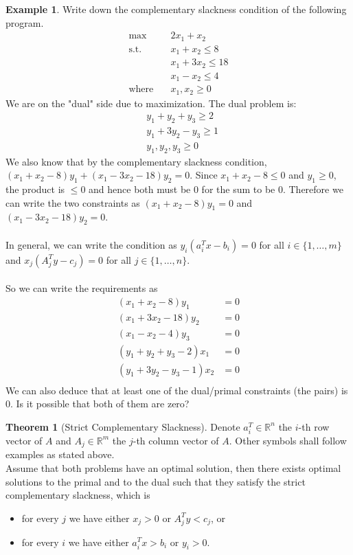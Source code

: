 \documentclass{article}
\theoremstyle{definition}
\newtheorem{theorem}{Theorem}[section]
\newtheorem{example}{Example}[section]
\begin{document}
	\begin{example}
		Write down the complementary slackness condition of the following program.
		\begin{align*}
			\text{max} \quad& 2x_1+x_2 \\
			\text{s.t.} \quad& x_1+x_2\leq8 \\
			& x_1+3x_2\leq 18 \\
			& x_1-x_2 \leq 4\\
			\text{where} \quad& x_1, x_2 \geq 0
		\end{align*}
		We are on the "dual" side due to maximization. The dual problem is:
		\begin{align*}
			& y_1+y_2+y_3 \geq 2 \\
			& y_1+3y_2-y_3 \geq 1 \\
			& y_1,y_2,y_3 \geq 0
		\end{align*}
		We also know that by the complementary slackness condition, $(x_1+x_2-8)y_1 + (x_1-3x_2-18)y_2 = 0$. Since $x_1+x_2-8 \leq 0$ and $y_1 \geq 0$, the product is $\leq 0$ and hence both must be 0 for the sum to be 0. Therefore we can write the two constraints as $(x_1+x_2-8)y_1 = 0$ and $(x_1-3x_2-18)y_2 = 0$.\\\\ In general, we can write the condition as $y_i(a_i^Tx-b_i)=0$ for all $i \in \{1, \dots, m\}$ and $x_j(A_j^Ty-c_j) = 0$ for all $j \in \{1, \dots, n\}$.\\\\ So we can write the requirements as
		\begin{align*}
			(x_1+x_2-8)y_1 &=0\\
			(x_1+3x_2-18)y_2 &= 0\\
			(x_1-x_2-4)y_3 &= 0\\
			(y_1+y_2+y_3-2)x_1 &= 0\\
			(y_1+3y_2-y_3-1)x_2 &= 0\\
		\end{align*}
		We can also deduce that at least one of the dual/primal constraints (the pairs) is 0. Is it possible that both of them are zero?
	\end{example}

	\begin{theorem}[Strict Complementary Slackness]\hfill\break
	    Denote $a_i^T \in \mathbb{R}^n$ the $i$-th row vector of $A$ and $A_j \in \mathbb{R}^m$ the $j$-th column vector of $A$. Other symbols shall follow examples as stated above.\\
	    Assume that both problems have an optimal solution, then there exists optimal solutions to the primal and to the dual such that they satisfy the strict complementary slackness, which is
		\begin{itemize}
			\item for every $j$ we have either $x_j > 0$ or $A_j^T y < c_j$, or
			\item for every $i$ we have either $a_i^Tx > b_i$ or $y_i > 0$.
		\end{itemize}
	\end{theorem}
\end{document}
